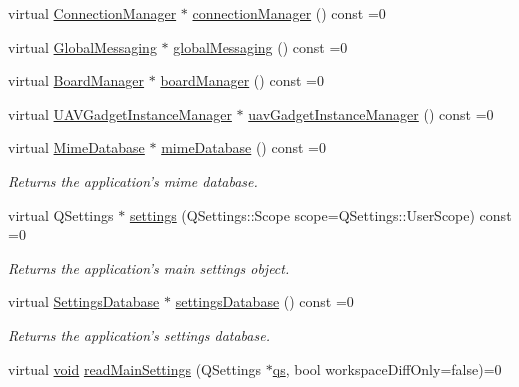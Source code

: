 \begin{DoxyCompactItemize}
virtual \hyperlink{class_core_1_1_connection_manager}{Connection\-Manager} $\ast$ \hyperlink{group___core_plugin_gab606d10ae8f0f9575d0e8ffb6e776ac7}{connection\-Manager} () const =0
\item 
virtual \hyperlink{class_core_1_1_global_messaging}{Global\-Messaging} $\ast$ \hyperlink{group___core_plugin_ga90d4f12b990192d622c2f164d577ebf3}{global\-Messaging} () const =0
\item 
virtual \hyperlink{class_core_1_1_board_manager}{Board\-Manager} $\ast$ \hyperlink{group___core_plugin_ga01532acba71e5af5bee3777209aebf7d}{board\-Manager} () const =0
\item 
virtual \hyperlink{class_core_1_1_u_a_v_gadget_instance_manager}{U\-A\-V\-Gadget\-Instance\-Manager} $\ast$ \hyperlink{group___core_plugin_ga6aeba1dab852cf7c211cc2405f124ee7}{uav\-Gadget\-Instance\-Manager} () const =0
\item 
virtual \hyperlink{class_core_1_1_mime_database}{Mime\-Database} $\ast$ \hyperlink{group___core_plugin_gac1e3260fb816ebaae2c4dc7cffbee93a}{mime\-Database} () const =0
\begin{DoxyCompactList}\small\item\em Returns the application's mime database. \end{DoxyCompactList}\item 
virtual Q\-Settings $\ast$ \hyperlink{group___core_plugin_gaa7af8fc52c8c8453fe27ab7105a594d2}{settings} (Q\-Settings\-::\-Scope scope=Q\-Settings\-::\-User\-Scope) const =0
\begin{DoxyCompactList}\small\item\em Returns the application's main settings object. \end{DoxyCompactList}\item 
virtual \hyperlink{class_core_1_1_settings_database}{Settings\-Database} $\ast$ \hyperlink{group___core_plugin_ga70be5be626fe168da78ba7a0ae383236}{settings\-Database} () const =0
\begin{DoxyCompactList}\small\item\em Returns the application's settings database. \end{DoxyCompactList}\item 
virtual \hyperlink{group___u_a_v_objects_plugin_ga444cf2ff3f0ecbe028adce838d373f5c}{void} \hyperlink{group___core_plugin_ga6328cac0278945d041c3813736c600b4}{read\-Main\-Settings} (Q\-Settings $\ast$\hyperlink{analyze_i_n_s_g_p_s_8m_a620a138c8981e0536c569d7761df4548}{qs}, bool workspace\-Diff\-Only=false)=0
\item 

\end{DoxyCompactItemize}
